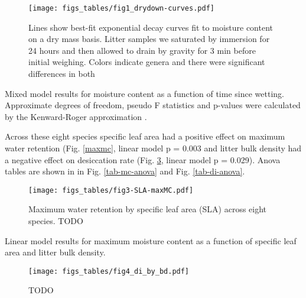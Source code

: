 \documentclass[fire,article,submit,moreauthors,pdftex]{Definitions/mdpi}
\begin{document}
\begin{figure}[H]
  \centering
  \label{fig1-drydown}
\texttt{[image: figs\_tables/fig1\_drydown-curves.pdf]}
\caption[Dry down curves for eight litter types.]{Lines show best-fit exponential decay curves fit to moisture content on a dry mass basis. Litter samples we saturated by immersion for 24 hours and then allowed to drain by gravity for 3 min before initial weighing. Colors indicate genera and there were significant differences in both }
\end{figure}


\begin{table}[H]
  \caption{Mixed model results for moisture content as a function of time since wetting. Approximate degrees of freedom, pseudo F statistics and p-values were calculated by the Kenward-Roger approximation \cite{Kenward_Roger-1997}.}
  \label{tab1-drydown}
\centering

\end{table}

Across these eight species specific leaf area had a positive effect on maximum water retention (Fig. \ref{maxmc}, linear model p = 0.003 and litter bulk density had a negative effect on desiccation rate (Fig. \ref{fig-bd-di}, linear model p = 0.029). Anova tables are shown in in Fig. \ref{tab-mc-anova} and Fig. \ref{tab-di-anova}.

\begin{figure}[H]
  \centering
  \label{fig-maxmc-di}
\texttt{[image: figs\_tables/fig3-SLA-maxMC.pdf]}
\caption[Maximum water retention by specific leaf area]{Maximum water retention by specific leaf area (SLA) across eight species.  TODO }
\end{figure}

\begin{table}[H]
  \caption{Linear model results for maximum moisture content as a function of specific leaf area and litter bulk density.}
  \label{tab2-mc-anova}
\centering

\end{table}


\begin{figure}[H]
  \centering
  \label{fig-bd-di}
\texttt{[image: figs\_tables/fig4\_di\_by\_bd.pdf]}
\caption[Litter density effect on dessication rate.]{  TODO }
\end{figure}
\end{document}
